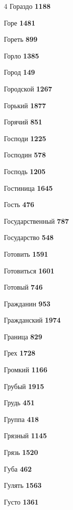 \begin{multicols}{4}
\noindent Гораздо \dotfill \textbf{\color{secondary} 1188}\par
\noindent Горе \dotfill \textbf{\color{secondary} 1481}\par
\noindent Гореть \dotfill \textbf{\color{secondary} 899}\par
\noindent Горло \dotfill \textbf{\color{secondary} 1385}\par
\noindent Город \dotfill \textbf{\color{secondary} 149}\par
\noindent Городской \dotfill \textbf{\color{secondary} 1267}\par
\noindent Горький \dotfill \textbf{\color{secondary} 1877}\par
\noindent Горячий \dotfill \textbf{\color{secondary} 851}\par
\noindent Господи \dotfill \textbf{\color{secondary} 1225}\par
\noindent Господин \dotfill \textbf{\color{secondary} 578}\par
\noindent Господь \dotfill \textbf{\color{secondary} 1205}\par
\noindent Гостиница \dotfill \textbf{\color{secondary} 1645}\par
\noindent Гость \dotfill \textbf{\color{secondary} 476}\par
\noindent Государственный \dotfill \textbf{\color{secondary} 787}\par
\noindent Государство \dotfill \textbf{\color{secondary} 548}\par
\noindent Готовить \dotfill \textbf{\color{secondary} 1591}\par
\noindent Готовиться \dotfill \textbf{\color{secondary} 1601}\par
\noindent Готовый \dotfill \textbf{\color{secondary} 746}\par
\noindent Гражданин \dotfill \textbf{\color{secondary} 953}\par
\noindent Гражданский \dotfill \textbf{\color{secondary} 1974}\par
\noindent Граница \dotfill \textbf{\color{secondary} 829}\par
\noindent Грех \dotfill \textbf{\color{secondary} 1728}\par
\noindent Громкий \dotfill \textbf{\color{secondary} 1166}\par
\noindent Грубый \dotfill \textbf{\color{secondary} 1915}\par
\noindent Грудь \dotfill \textbf{\color{secondary} 451}\par
\noindent Группа \dotfill \textbf{\color{secondary} 418}\par
\noindent Грязный \dotfill \textbf{\color{secondary} 1145}\par
\noindent Грязь \dotfill \textbf{\color{secondary} 1520}\par
\noindent Губа \dotfill \textbf{\color{secondary} 462}\par
\noindent Гулять \dotfill \textbf{\color{secondary} 1563}\par
\noindent Густо \dotfill \textbf{\color{secondary} 1361}\par


\end{multicols}
